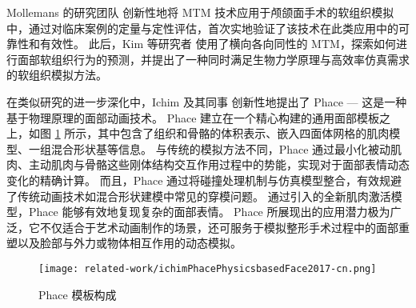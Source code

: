 Mollemans 的研究团队 \cite{mollemansPredictingSoftTissue2007} 创新性地将 MTM 技术应用于颅颌面手术的软组织模拟中，通过对临床案例的定量与定性评估，首次实地验证了该技术在此类应用中的可靠性和有效性。
此后，Kim 等研究者 \cite{kimNewSofttissueSimulation2010} 使用了横向各向同性的 MTM，探索如何进行面部软组织行为的预测，并提出了一种同时满足生物力学原理与高效率仿真需求的软组织模拟方法。

在类似研究的进一步深化中，Ichim 及其同事 \cite{ichimPhacePhysicsbasedFace2017} 创新性地提出了 Phace --- 这是一种基于物理原理的面部动画技术。
Phace 建立在一个精心构建的通用面部模板之上，如图 \ref{fig:ichimPhacePhysicsbasedFace2017} 所示，其中包含了组织和骨骼的体积表示、嵌入四面体网格的肌肉模型、一组混合形状基等信息。
与传统的模拟方法不同，Phace 通过最小化被动肌肉、主动肌肉与骨骼这些刚体结构交互作用过程中的势能，实现对于面部表情动态变化的精确计算。
而且，Phace 通过将碰撞处理机制与仿真模型整合，有效规避了传统动画技术如混合形状建模中常见的穿模问题。
通过引入的全新肌肉激活模型，Phace 能够有效地复现复杂的面部表情。
Phace 所展现出的应用潜力极为广泛，它不仅适合于艺术动画制作的场景，还可服务于模拟整形手术过程中的面部重塑以及脸部与外力或物体相互作用的动态模拟。

\begin{figure}
  \centering
  \texttt{[image: related-work/ichimPhacePhysicsbasedFace2017-cn.png]}
  \caption{Phace 模板构成 \cite{ichimPhacePhysicsbasedFace2017}}
  \label{fig:ichimPhacePhysicsbasedFace2017}
\end{figure}

